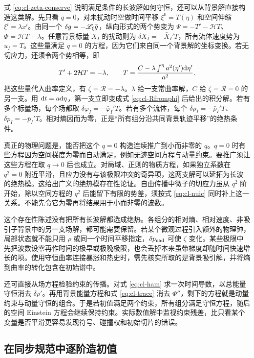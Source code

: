 式 \eqref{eq:cl-zeta-conserve} 说明满足条件的长波解如何守恒，还可以从背景解直接构造这类解。先只看 $q=0$，对未扰动时空做时间平移 $\xi^0=T(\eta)$ 和空间伸缩 $\xi^i=\lambda x^i$。由同一个 $\delta g=-\mathscr{L}_\xi\bar g$，纵向形式的两个势变为 $\Psi=-T'-\mathcal H T$、$\Phi=\mathcal H T+\lambda$。任意背景标量 $X_I$ 的扰动则为 $\delta X_I=-\bar X_I'T$，所有流体速度势为 $u_I=T$。这些量满足 $q=0$ 的方程，因为它们来自同一个背景解的坐标变换。若无切应力，还须令两个势相等，即
\[
 T'+2\mathcal H T=-\lambda,\qquad
 T=\frac{C-\lambda\int^\eta a^2(\eta')\dd\eta'}{a^2}.
\]
把这些量代入曲率定义，有 $\zeta=\mathcal R=-\lambda$。$\lambda$ 给一支常曲率解，$C$ 给 $\zeta=\mathcal R=0$ 的另一支。用 $\dd t=a\dd\eta$，第一支立即变成式 \eqref{eq:cl-Rfromphi} 后给出的积分解。若有多个标量场，每个场都取 $\delta\varphi_I=-\bar\varphi_I'T$。若有多个流体，每个 $\delta\rho_I=-\bar\rho_I'T$、$\delta p_I=-\bar p_I'T$。相对熵因而为零，正是“所有组分沿共同背景轨迹平移”的绝热条件。

真正的物理问题是，能否把这个 $q=0$ 构造连续推广到小而非零的 $q$。$q=0$ 时有些方程因为空间梯度为零而自动满足，例如无迹空间方程与动量约束。要推广须让这些方程在取 $q\to0$ 后也成立。对局域、正则的物质方程，如果独立系数在 $q^2=0$ 附近平滑，且应力没有与该极限冲突的奇异项，这两支解可以延拓为长波的绝热模。这给出广义的绝热模存在性论证。自由传播中微子的切应力虽从 $q^2$ 阶开始，除以空间方程的 $q^2$ 后能留下有限的势差，须按式 \eqref{eq:cl-nuic} 同时补上这一关系。不能先令它为零再将结果用于小而非零的波数。

这个存在性陈述没有把所有长波解都选成绝热。各组分的相对熵、相对速度、非吸引子背景中的另一支场解，都可能需要保留。若某个微观过程引入额外的物理钟，局部状态就不能只用 $\rho$ 或同一个时间平移指定，$\delta p_{\rm nad}$ 可使 $\zeta$ 变化。某些极限中先把波数设零再作时间的极早或极晚极限，也会丢掉本来虽带梯度却随时间快速增长的项。使用守恒曲率连接暴涨和热史时，需先核实所取的是背景吸引解，并将熵到曲率的转化包含在初始谱中。

还可直接从场方程检验约束的传播。对式 \eqref{eq:cl-ham} 求一次时间导数，以总能量守恒消去 $\delta\rho'$。再用背景能量方程和式 \eqref{eq:cl-trace} 消去 $\Phi''$，剩下的方程就是动量约束与动量守恒的组合。于是若初值满足两个约束，所有组分满足守恒方程，随后的空间 Einstein 方程会继续保持约束。实际数值解中监视约束残差，比只看某个变量是否平滑更容易发现符号、碰撞权和初始切片的错误。

\subsection{在同步规范中逐阶造初值}

